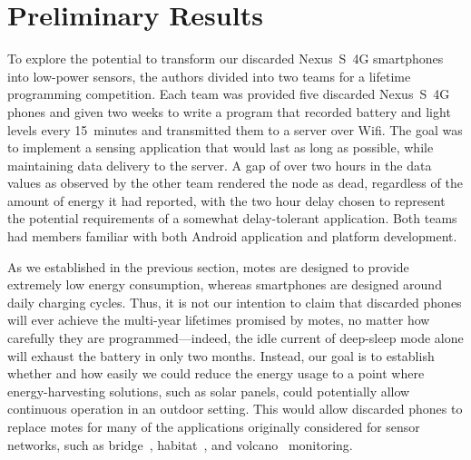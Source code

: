 \section{Preliminary Results}
\label{sec-results}

To explore the potential to transform our discarded Nexus~S~4G smartphones
into low-power sensors, the authors divided into two teams for a lifetime
programming competition. Each team was provided five discarded Nexus~S~4G
phones and given two weeks to write a program that recorded battery and light
levels every 15~minutes and transmitted them to a server over Wifi. The goal
was to implement a sensing application that would last as long as possible,
while maintaining data delivery to the server. A gap of over two hours in the
data values as observed by the other team rendered the node as dead,
regardless of the amount of energy it had reported, with the two hour delay
chosen to represent the potential requirements of a somewhat delay-tolerant
application. Both teams had members familiar with both Android application and
platform development.

As we established in the previous section, motes are designed to provide
extremely low energy consumption, whereas smartphones are designed around
daily charging cycles. Thus, it is not our intention to claim that discarded
phones will ever achieve the multi-year lifetimes promised by motes, no
matter how carefully they are programmed---indeed, the idle current of
deep-sleep mode alone will exhaust the battery in only two months. Instead,
our goal is to establish whether and how easily we could reduce the energy
usage to a point where energy-harvesting solutions, such as solar panels,
could potentially allow continuous operation in an outdoor setting. This
would allow discarded phones to replace motes for many of the applications
originally considered for sensor networks, such as
bridge~\cite{ggb-monitoring}, habitat~\cite{gdi}, and
volcano~\cite{lance-sensys08} monitoring.

